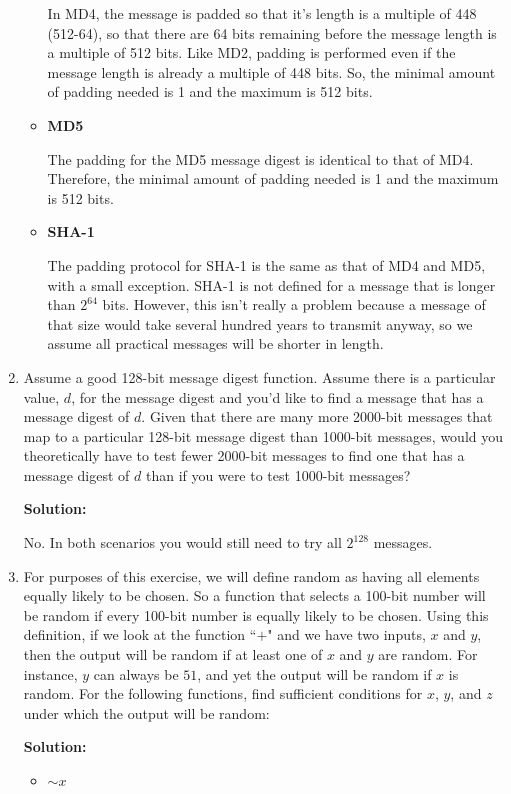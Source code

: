 \documentclass[11pt]{article}
\begin{document}
\begin{enumerate}
\begin{itemize}
In MD4, the message is padded so that it's length is a multiple of 448 (512-64), so that there are 64 bits remaining before the message length is a multiple of 512 bits.  Like MD2, padding is performed even if the message length is already a multiple of 448 bits.  So, the minimal amount of padding needed is 1 and the maximum is 512 bits.  
\item \textbf{MD5}

The padding for the MD5 message digest is identical to that of MD4.  Therefore, the minimal amount of padding needed is 1 and the maximum is 512 bits.  
\item \textbf{SHA-1}

The padding protocol for SHA-1 is the same as that of MD4 and MD5, with a small exception.  SHA-1 is not defined for a message that is longer than $2^{64}$ bits.  However, this isn't really a problem because a message of that size would take several hundred years to transmit anyway, so we assume all practical messages will be shorter in length.  
\end{itemize}

\item Assume a good 128-bit message digest function. Assume there is a particular value, $d$, for the message digest and you'd like to find a message that has a message digest of $d$. Given that there are many more 2000-bit messages that map to a particular 128-bit message digest than 1000-bit messages, would you theoretically have to test fewer 2000-bit messages to find one that has a message digest of $d$ than if you were to test 1000-bit messages?

\textbf{Solution: }

No.  In both scenarios you would still need to try all $2^{128}$ messages.  

\item For purposes of this exercise, we will define random as having all elements equally likely to be chosen. So a function that selects a 100-bit number will be random if every 100-bit number is equally likely to be chosen. Using this definition, if we look at the function ``$+$" and we have two inputs, $x$ and $y$, then the output will be random if at least one of $x$ and $y$ are random. For instance, $y$ can always be $51$, and yet the output will be random if $x$ is random. For the following functions, find sufficient conditions for $x$, $y$, and $z$ under which the output will be random:

\textbf{Solution: }

\begin{itemize}
\item $ \sim x$


\end{itemize}
\end{enumerate}
\end{document}
